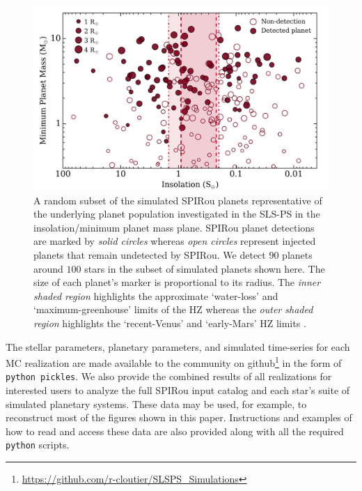 \begin{figure}
  \centering
  \includegraphics[width=0.8\hsize]{figures/SPIRoudet_Fmpsini.png}%
  \caption[One realization of targetted and detected planets in the SLS-PS versus insolation and ]
      {\small A random subset of the simulated SPIRou planets representative of the underlying planet
    population investigated in the SLS-PS in the insolation/minimum planet mass plane.
    SPIRou planet detections are marked by
    \emph{solid circles} whereas \emph{open circles} represent injected planets that remain undetected by SPIRou.
    We detect 90 planets around $100$ stars in the subset of simulated planets shown here.
    The size of each planet's marker is proportional to its radius. The \emph{inner shaded region} highlights
    the approximate `water-loss' and `maximum-greenhouse' limits of the HZ whereas the
    \emph{outer shaded region} highlights the `recent-Venus' and `early-Mars' HZ limits \citep{kopparapu13}.}
  \label{BSfig:spiroudet}
\end{figure}


The stellar parameters, planetary parameters, and simulated time-series for each MC realization are made
available to the community on
github\footnote{\href{https://github.com/r-cloutier/SLSPS\_Simulations}{https://github.com/r-cloutier/SLSPS\_Simulations}}
in the form of \texttt{python pickles}.
We also provide the combined results of all realizations for interested users to analyze the full SPIRou
input catalog and each star's suite of simulated planetary systems. These data may be used, for example,
to reconstruct most of the figures shown in this paper. Instructions and examples of how to read and
access these data are also provided along with all the required \texttt{python} scripts.


